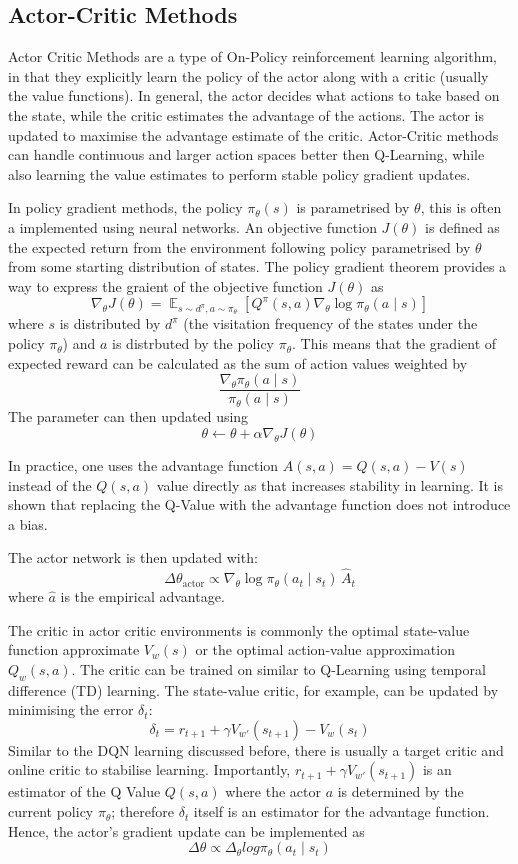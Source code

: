 \documentclass[12pt,a4paper]{report}
\DeclareMathOperator{\EX}{\mathbb{E}}
\begin{document}
\subsection{Actor-Critic Methods}
Actor Critic Methods are a type of On-Policy reinforcement learning algorithm, in that they explicitly learn the policy of the actor along with a critic (usually the value functions). In general, the actor decides what actions to take based on the state, while the critic estimates the advantage of the actions. The actor is updated to maximise the advantage estimate of the critic. Actor-Critic methods can handle continuous and larger action spaces better then Q-Learning, while also learning the value estimates to perform stable policy gradient updates. \par 
 
In policy gradient methods, the policy $\pi_\theta(s)$ is parametrised by $\theta$, this is often a implemented using neural networks. An objective function $J(\theta)$ is defined as the expected return from the environment following policy parametrised by $\theta$ from some starting distribution of states. The policy gradient theorem provides a way to express the graient of the objective function $J(\theta)$ as 
\[
\nabla_{\theta} J(\theta) = \EX_{s \sim d^{\pi}, a \sim \pi_{\theta}} \left[ Q^{\pi}(s, a) \nabla_{\theta} \log \pi_{\theta}(a \mid s) \right]
\]
where $s$ is distributed by $d^\pi$ (the visitation frequency of the states under the policy $\pi_\theta$) and $a$ is distrbuted by the policy $\pi_\theta$. This means that the gradient of expected reward can be calculated as the sum of action values weighted by 
\[
\frac{\nabla_{\theta} \pi_{\theta}(a \mid s)}{\pi_{\theta}(a \mid s)} 
\]
The parameter can then updated using 
\[
\theta \leftarrow \theta + \alpha \nabla_{\theta} J(\theta)
\] \par
In practice, one uses the advantage function $A(s, a) = Q(s, a) - V(s)$ instead of the $Q(s, a)$ value directly as that increases stability in learning. It is shown that replacing the Q-Value with the advantage function does not introduce a bias. 

The actor network is then updated with:
\[
\Delta \theta_{\text{actor}} \propto \nabla_{\theta} \log \pi_{\theta}(a_t \mid s_t) \, \hat{A}_t
\]
where $\hat{a}$ is the empirical advantage.\par 

The critic in actor critic environments is commonly the optimal state-value function approximate $V_w(s)$ or the optimal action-value approximation $Q_w(s,a)$. The critic can be trained on similar to Q-Learning using temporal difference (TD) learning. The state-value critic, for example, can be updated by minimising the error $\delta_t$:
\[
\delta_t = r_{t+1} + \gamma V_{w'}(s_{t+1}) - V_{w}(s_t)
\]
Similar to the DQN learning discussed before, there is usually a target critic and online critic to stabilise learning. Importantly, $ r_{t+1} + \gamma V_{w'}(s_{t+1})$ is an estimator of the Q Value $Q(s,a)$ where the actor $a$ is determined by the current policy $\pi_\theta$; therefore $\delta_t$ itself is an estimator for the advantage function. Hence, the actor's gradient update can be implemented as 
\[\Delta \theta \propto \Delta_\theta log \pi_\theta (a_t \mid s_t)\]
\end{document}
